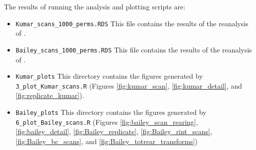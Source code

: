     The results of running the analysis and plotting scripts are:
    \begin{itemize}
        \item \texttt{Kumar\_scans\_1000\_perms.RDS} This file contains the results of the reanalysis of \citet{Kumar2013}.
        \item \texttt{Bailey\_scans\_1000\_perms.RDS} This file contains the results of the reanalysis of \citet{Bailey2008}.
        \item \texttt{Kumar\_plots} This directory contains the figures generated by \texttt{3\_plot\_Kumar\_scans.R} 
            (Figures \ref{fig:kumar_scan}, \ref{fig:kumar_detail}, and \ref{fig:replicate_kumar}).
        \item \texttt{Bailey\_plots} This directory contains the figures generated by \texttt{6\_plot\_Bailey\_scans.R}
            (Figures \ref{fig:bailey_scan_rearing}, \ref{fig:bailey_detail}, \ref{fig:Bailey_replicate}, \ref{fig:Bailey_rint_scans}, \ref{fig:Bailey_bc_scans}, and \ref{fig:Bailey_totrear_transforms}) 
    \end{itemize}



